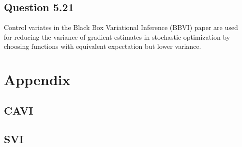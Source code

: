 \documentclass{article}
\begin{document}
\subsection{Question 5.21}
Control variates in the Black Box Variational Inference (BBVI) paper are used for reducing the variance of gradient estimates in stochastic optimization by choosing functions with equivalent expectation but lower variance.

\newpage
\appendix
\section{Appendix}
\subsection{CAVI}\label{appendix:CAVI}

\subsection{SVI}\label{appendix:SVI}

\end{document}
